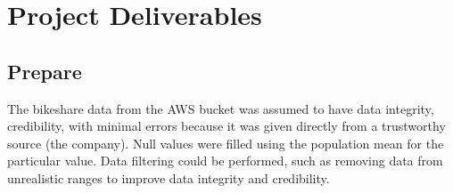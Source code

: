 \documentclass[11pt, onecolumn]{article}
\begin{document}
\section{Project Deliverables}

\subsection{Prepare}
The bikeshare data from the AWS bucket was assumed to have data integrity, credibility, with minimal errors because it was given directly from a trustworthy source (the company). Null values were filled using the population mean for the particular value. Data filtering could be performed, such as removing data from unrealistic ranges to improve data integrity and credibility.
\end{document}

